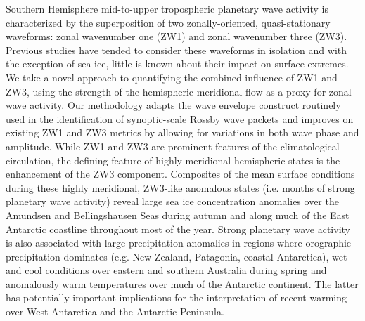 Southern Hemisphere mid-to-upper tropospheric planetary wave activity is characterized by the superposition of two zonally-oriented, quasi-stationary waveforms: zonal wavenumber one (ZW1) and zonal wavenumber three (ZW3). Previous studies have tended to consider these waveforms in isolation and with the exception of sea ice, little is known about their impact on surface extremes. We take a novel approach to quantifying the combined influence of ZW1 and ZW3, using the strength of the hemispheric meridional flow as a proxy for zonal wave activity. Our methodology adapts the wave envelope construct routinely used in the identification of synoptic-scale Rossby wave packets and improves on existing ZW1 and ZW3 metrics by allowing for variations in both wave phase and amplitude. While ZW1 and ZW3 are prominent features of the climatological circulation, the defining feature of highly meridional hemispheric states is the enhancement of the ZW3 component. Composites of the mean surface conditions during these highly meridional, ZW3-like anomalous states (i.e. months of strong planetary wave activity) reveal large sea ice concentration anomalies over the Amundsen and Bellingshausen Seas during autumn and along much of the East Antarctic coastline throughout most of the year. Strong planetary wave activity is also associated with large precipitation anomalies in regions where orographic precipitation dominates (e.g. New Zealand, Patagonia, coastal Antarctica), wet and cool conditions over eastern and southern Australia during spring and anomalously warm temperatures over much of the Antarctic continent. The latter has potentially important implications for the interpretation of recent warming over West Antarctica and the Antarctic Peninsula.
